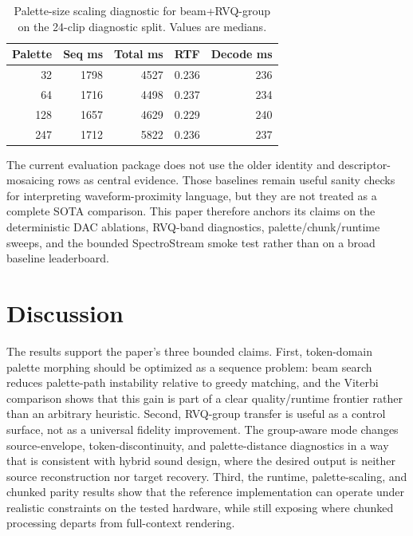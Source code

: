 \documentclass[twoside,a4paper]{article}
\begin{document}
\begin{table}[!t]
    \centering
    \scriptsize
    \setlength{\tabcolsep}{2.8pt}
    \caption{Palette-size scaling diagnostic for beam+RVQ-group on the 24-clip diagnostic split. Values are medians.}
    \label{tab:palette-scaling}
    \begin{tabular}{rrrrr}
    \toprule
    Palette & Seq ms & Total ms & RTF & Decode ms \\
    \midrule
    32 & 1798 & 4527 & 0.236 & 236 \\
    64 & 1716 & 4498 & 0.237 & 234 \\
    128 & 1657 & 4629 & 0.229 & 240 \\
    247 & 1712 & 5822 & 0.236 & 237 \\
    \bottomrule
    \end{tabular}
\end{table}

The current evaluation package does not use the older identity and descriptor-mosaicing rows as central evidence. Those baselines remain useful sanity checks for interpreting waveform-proximity language, but they are not treated as a complete SOTA comparison. This paper therefore anchors its claims on the deterministic DAC ablations, RVQ-band diagnostics, palette/chunk/runtime sweeps, and the bounded SpectroStream smoke test rather than on a broad baseline leaderboard.


\section{Discussion}

The results support the paper's three bounded claims. First, token-domain palette morphing should be optimized as a sequence problem: beam search reduces palette-path instability relative to greedy matching, and the Viterbi comparison shows that this gain is part of a clear quality/runtime frontier rather than an arbitrary heuristic. Second, RVQ-group transfer is useful as a control surface, not as a universal fidelity improvement. The group-aware mode changes source-envelope, token-discontinuity, and palette-distance diagnostics in a way that is consistent with hybrid sound design, where the desired output is neither source reconstruction nor target recovery. Third, the runtime, palette-scaling, and chunked parity results show that the reference implementation can operate under realistic constraints on the tested hardware, while still exposing where chunked processing departs from full-context rendering.
\end{document}
